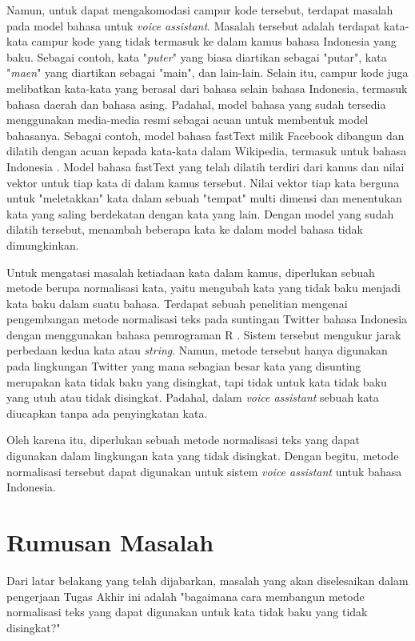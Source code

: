 Namun, untuk dapat mengakomodasi campur kode tersebut, terdapat masalah pada model bahasa untuk \textit{voice assistant}. Masalah tersebut adalah terdapat kata-kata campur kode yang tidak termasuk ke dalam kamus bahasa Indonesia yang baku. Sebagai contoh, kata "\textit{puter}" yang biasa diartikan sebagai "putar", kata "\textit{maen}" yang diartikan sebagai "main", dan lain-lain. Selain itu, campur kode juga melibatkan kata-kata yang berasal dari bahasa selain bahasa Indonesia, termasuk bahasa daerah dan bahasa asing. Padahal, model bahasa yang sudah tersedia menggunakan media-media resmi sebagai acuan untuk membentuk model bahasanya. Sebagai contoh, model bahasa fastText milik Facebook dibangun dan dilatih dengan acuan kepada kata-kata dalam Wikipedia, termasuk untuk bahasa Indonesia \parencite{bojanowski2016enriching}. Model bahasa fastText yang telah dilatih terdiri dari kamus dan nilai vektor untuk tiap kata di dalam kamus tersebut. Nilai vektor tiap kata berguna untuk "meletakkan" kata dalam sebuah "tempat" multi dimensi dan menentukan kata yang saling berdekatan dengan kata yang lain. Dengan model yang sudah dilatih tersebut, menambah beberapa kata ke dalam model bahasa tidak dimungkinkan.

Untuk mengatasi masalah ketiadaan kata dalam kamus, diperlukan sebuah metode berupa normalisasi kata, yaitu mengubah kata yang tidak baku menjadi kata baku dalam suatu bahasa. Terdapat sebuah penelitian mengenai pengembangan metode normalisasi teks pada suntingan Twitter bahasa Indonesia dengan menggunakan bahasa pemrograman R \parencite{saragih2017normalisasi}. Sistem tersebut mengukur jarak perbedaan kedua kata atau \textit{string}. Namun, metode tersebut hanya digunakan pada lingkungan Twitter yang mana sebagian besar kata yang disunting merupakan kata tidak baku yang disingkat, tapi tidak untuk kata tidak baku yang utuh atau tidak disingkat. Padahal, dalam \textit{voice assistant} sebuah kata diucapkan tanpa ada penyingkatan kata.

Oleh karena itu, diperlukan sebuah metode normalisasi teks yang dapat digunakan dalam lingkungan kata yang tidak disingkat. Dengan begitu, metode normalisasi tersebut dapat digunakan untuk sistem \textit{voice assistant} untuk bahasa Indonesia.

\section{Rumusan Masalah}

Dari latar belakang yang telah dijabarkan, masalah yang akan diselesaikan dalam pengerjaan Tugas Akhir ini adalah "bagaimana cara membangun metode normalisasi teks yang dapat digunakan untuk kata tidak baku yang tidak disingkat?"

